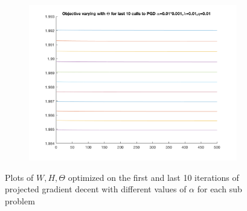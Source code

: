 \documentclass{article}
\newcommand{\0}{\mathrm{0}}
\newcommand{\1}{\mathrm{1}}
\begin{document}
\begin{figure}[H]
\begin{subfigure}[b]{0.3\textwidth}
  \end{subfigure}
\centering
  \begin{subfigure}[b]{0.3\textwidth}
    \includegraphics[width=\textwidth]{fixed-step-change-alpha-Th100last.png}
  \end{subfigure}

  \caption{Plots of $W, H, \Theta$ optimized on the first and last 10 iterations of projected gradient decent with different values of $\alpha$ for each sub problem}
\end{figure}
\end{document}
